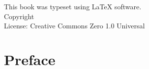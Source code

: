 \documentclass{book}
\makeatletter
\newcommand{\booklicense}{Creative Commons Zero 1.0 Universal}
\newcommand{\bookauthor}{\@author}
\makeatother
\begin{document}
\thispagestyle{empty}

\begin{flushleft}
\vspace*{\fill}
This book was typeset using \LaTeX{} software.\\
\vspace{\fill}
Copyright \textcopyright{} \the\year{}  \bookauthor\\
License: \booklicense
\end{flushleft}

\addtocounter{page}{2}

\chapter*{Preface}
\end{document}

